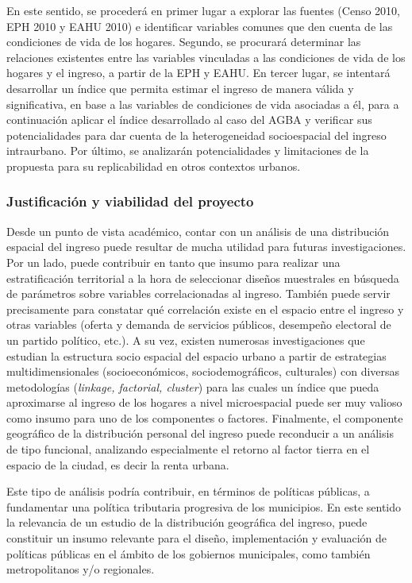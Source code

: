 En este sentido, se procederá en primer lugar a explorar las fuentes (Censo 2010, EPH 2010 y EAHU 2010) e identificar variables comunes que den cuenta de las condiciones de vida de los hogares. Segundo, se procurará determinar las relaciones existentes entre las variables vinculadas a las condiciones de vida de los hogares y el ingreso, a partir de la EPH y EAHU. En tercer lugar, se intentará desarrollar un índice que permita estimar el ingreso de manera válida y significativa, en base a las variables de condiciones de vida asociadas a él, para a continuación aplicar el índice desarrollado al caso del AGBA y verificar sus potencialidades para dar cuenta de la heterogeneidad socioespacial del ingreso intraurbano. Por último, se analizarán potencialidades y limitaciones de la propuesta para su replicabilidad en otros contextos urbanos.


	\subsubsection{Justificación y viabilidad del proyecto}


Desde un punto de vista académico, contar con un análisis de una distribución espacial del ingreso puede resultar de mucha utilidad para futuras investigaciones. Por un lado, puede contribuir en tanto que insumo para realizar una estratificación territorial a la hora de seleccionar diseños muestrales en búsqueda de parámetros sobre variables correlacionadas al ingreso. También puede servir precisamente para constatar qué correlación existe en el espacio entre el ingreso y otras variables (oferta y demanda de servicios públicos, desempeño electoral de un partido político, etc.). A su vez, existen numerosas investigaciones que estudian la estructura socio espacial del espacio urbano a partir de estrategias multidimensionales (socioeconómicos, sociodemográficos, culturales) con diversas metodologías (\textit{linkage, factorial, cluster}) para las cuales un índice que pueda aproximarse al ingreso de los hogares a nivel microespacial puede ser muy valioso como insumo para uno de los componentes o factores. Finalmente, el componente geográfico de la distribución personal del ingreso puede reconducir a un análisis de tipo funcional, analizando especialmente el retorno al factor tierra en el espacio de la ciudad, es decir la renta urbana. 

Este tipo de análisis podría contribuir, en términos de políticas públicas, a fundamentar una política tributaria progresiva de los municipios. En este sentido la relevancia de un estudio de la distribución geográfica del ingreso, puede constituir un insumo relevante para el diseño, implementación y evaluación de políticas públicas en el ámbito de los gobiernos municipales, como también metropolitanos y/o regionales.

